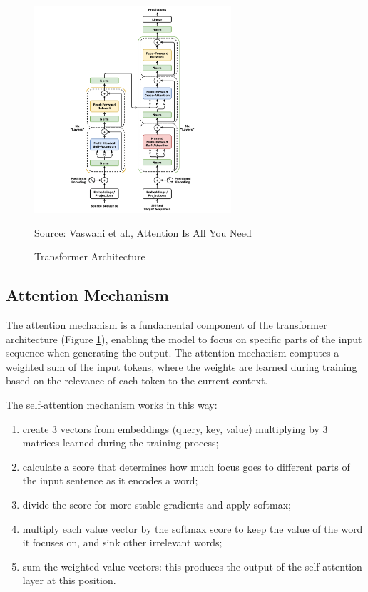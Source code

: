 \begin{figure}[h!]
  \centering
  \includegraphics[width=0.65\textwidth]{images/transformer_architecture.png}
  \caption{Transformer Architecture}
  { Source: Vaswani et al., Attention Is All You Need \cite{vaswani2023attentionneed}}
  \label{fig:transformer_architecture}
\end{figure}

\subsection{Attention Mechanism}
\label{sub:attention_mechanism}

The attention mechanism is a fundamental component of the transformer
architecture (Figure \ref{fig:transformer_architecture}), enabling the model to focus
on specific parts of the input sequence when generating the output. The
attention mechanism computes a weighted sum of the input tokens, where the weights
are learned during training based on the relevance of each token to the current context.

The self-attention mechanism works in this way:
\begin{enumerate}
  \item create 3 vectors from embeddings (query, key, value) multiplying by 3 matrices
    learned during the training process;

  \item calculate a score that determines how much focus goes to different parts
    of the input sentence as it encodes a word;

  \item divide the score for more stable gradients and apply softmax;

  \item multiply each value vector by the softmax score to keep the value of the
    word it focuses on, and sink other irrelevant words;

  \item sum the weighted value vectors: this produces the output of the self-attention
    layer at this position.
\end{enumerate}

